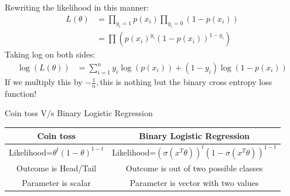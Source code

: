 \documentclass[handout]{beamer}
\begin{document}
\begin{frame}
Rewriting the likelihood in this manner:
\begin{align*}
    L(\theta)&= \prod_{y_i=1}p(x_i)\prod_{y_i=0}(1-p(x_i))\\
    &=\prod\left(p(x_i)^{y_i}(1-p(x_i))^{1-y_i}\right)
\end{align*}
Taking log on both sides:\\
\begin{align*}
    \log(L(\theta)) &= \sum_{i=1}^n y_i\log(p(x_i)) + (1-y_i)\log(1-p(x_i))
\end{align*}
If we multiply this by $-\frac{1}{n},$this is nothing but the binary cross entropy loss function!

\end{frame}
\begin{frame}{Coin toss V/s Binary Logistic Regression}
\begin{center}
    \begin{tabular}{|c|c|}
    \hline
    \textbf{Coin toss} & \textbf{Binary Logistic Regression} \\
    \hline
    Likelihood=$\theta^{t}(1-\theta)^{1-t}$& Likelihood=$(\sigma(x^T\theta))^t(1-\sigma(x^T\theta))^{1-t}$ \\
    \pause
    Outcome is Head/Tail & Outcome is out of two possible classes \\
    \pause
    Parameter is scalar & Parameter is vector with two values\\
    \hline
  \end{tabular}
\end{center}    
\end{frame}
\end{document}
